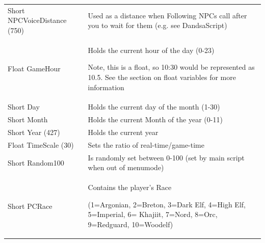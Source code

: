 \begin{longtable}[]{@{}
  >{\raggedright\arraybackslash}p{}
  >{\raggedright\arraybackslash}p{}@{}}
\toprule
\endhead
Short NPCVoiceDistance (750) & Used as a distance when Following NPCs
call after you to wait for them (e.g. see DandsaScript) \\
Float GameHour & Holds the current hour of the day (0-23)

Note, this is a float, so 10:30 would be represented as 10.5. See the
section on float variables for more information \\
Short Day & Holds the current day of the month (1-30) \\
Short Month & Holds the current Month of the year (0-11) \\
Short Year (427) & Holds the current year \\
Float TimeScale (30) & Sets the ratio of real-time/game-time \\
Short Random100 & Is randomly set between 0-100 (set by main script when
out of menumode) \\
Short PCRace & Contains the player's Race

(1=Argonian, 2=Breton, 3=Dark Elf, 4=High Elf, 5=Imperial, 6= Khajiit,
7=Nord, 8=Orc, 9=Redguard, 10=Woodelf)


\end{longtable}
